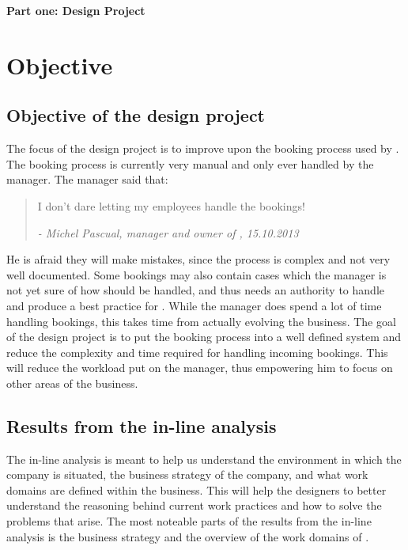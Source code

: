\textbf{\LARGE{Part one: Design Project}}

\section{Objective}

\subsection{Objective of the design project}
The focus of the design project is to improve upon the booking process used by 
\gomonkey. The booking process is currently very manual and only ever handled by 
the manager. The manager said that: 

\begin{quotation}
I don't dare letting my employees handle the bookings!

\em - Michel Pascual, manager and owner of \gomonkey, 15.10.2013
\end{quotation}

He is afraid they will make mistakes, since the process is complex and not very 
well documented. Some bookings may also contain cases which the manager is not 
yet sure of how should be handled, and thus needs an authority to handle and  
produce a best practice for \gomonkey{}. While the manager does spend a lot of
time handling bookings, this takes time from actually evolving the business.
The goal of the design project is to put the booking process into a 
well defined system and reduce the complexity and time required for handling
incoming bookings. This will reduce the workload put on the manager, thus 
empowering him to focus on other areas of the business.

\subsection{Results from the in-line analysis}
The in-line analysis is meant to help us understand the environment in which 
the company is situated, the business strategy of the company, and what work
domains are defined within the business. This will help the designers to
better understand the reasoning behind current work practices and how to 
solve the problems that arise. The most noteable parts of the results from 
the in-line analysis is the business strategy and the overview of the work 
domains of \gomonkey{}.

